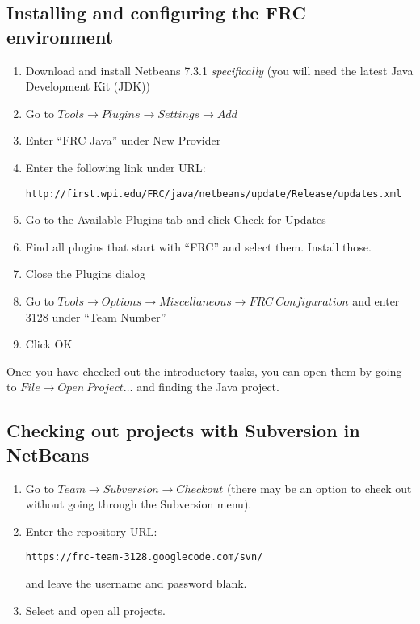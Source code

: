 \documentclass[a4paper]{article}
\begin{document}
\subsection{Installing and configuring the FRC environment}
\begin{enumerate}
\item{Download and install Netbeans 7.3.1 \textit{specifically} (you will need the latest Java Development Kit (JDK))}
\item{Go to $Tools \rightarrow Plugins \rightarrow Settings \rightarrow Add$}
\item{Enter ``FRC Java'' under New Provider}
\item{Enter the following link under URL: \begin{verbatim}http://first.wpi.edu/FRC/java/netbeans/update/Release/updates.xml\end{verbatim}}
\item{Go to the Available Plugins tab and click Check for Updates}
\item{Find all plugins that start with ``FRC'' and select them. Install those.}
\item{Close the Plugins dialog}
\item{Go to $Tools\rightarrow Options\rightarrow Miscellaneous\rightarrow FRC\ Configuration$ and enter 3128 under ``Team Number''}
\item{Click OK}
\end{enumerate}

Once you have checked out the introductory tasks, you can open them by going to $File\rightarrow Open\ Project\ldots$ and finding the Java project.

\subsection{Checking out projects with Subversion in NetBeans}
\begin{enumerate}
\item{Go to $Team\rightarrow Subversion\rightarrow Checkout$ (there may be an option to check out without going through the Subversion menu).}
\item{Enter the repository URL:\begin{verbatim}https://frc-team-3128.googlecode.com/svn/\end{verbatim} and leave the username and password blank.}
\item{Select and open all projects.}
\end{enumerate}
\end{document}
